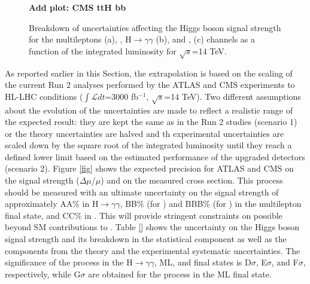 \begin{figure}[!htbp]
  \begin{center}
    \textbf{Add plot: CMS ttH bb}
    \caption{Breakdown of uncertainties affecting the Higgs boson signal strength for the \ttH multileptons (a), \ttH, H$\rightarrow\gamma\gamma$ (b), and \ttH, \Hbb (c) channels as a function of the integrated luminosity for $\sqrt{s}$=14 TeV.}
    \label{fig:topyukawa:theoATLAS}
  \end{center}
\end{figure}


As reported earlier in this Section, the extrapolation is based on the scaling of the current Run 2 analyses performed by the ATLAS and CMS experiments to HL-LHC conditions ($\int \mathcal{L}dt$=3000 fb$^{-1}$, $\sqrt{s}$=14 TeV).
Two different assumptions about the evolution of the uncertainties are made to reflect a realistic range of the expected result:
they are kept the same as in the Run 2 studies (scenario 1) or the theory uncertainties are halved and th experimental uncertainties are scaled down by the square root of the integrated luminosity until they reach a defined lower limit based on the estimated performance of the upgraded detectors (scenario 2).
Figure \ref{fig} shows the expected precision for ATLAS and CMS on the signal strength ($\Delta\mu$/$\mu$) and on the measured cross section.
This process should be measured with an ultimate uncertainty on the signal strength of approximately AA\% in H$\rightarrow\gamma\gamma$, BB\% (for \ttH) and BBB\% (for \tH) in the multilepton final state, and CC\% in \Hbb. This will provide stringent constraints on possible beyond SM contributions to \ttH. Table \ref{} shows the uncertainty on the Higgs boson signal strength and its breakdown in the statistical component as well as the components from the theory and the experimental systematic uncertainties.
The significance of the \ttH process in the H$\rightarrow \gamma\gamma$, ML, and \bbbar final states is D$\sigma$, E$\sigma$, and F$\sigma$, respectively, while G$\sigma$ are obtained for the \TH process in the ML final state.

